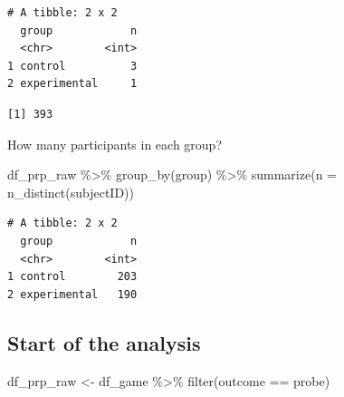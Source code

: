 \documentclass[
  letterpaper,
  DIV=11,
  numbers=noendperiod]{scrartcl}
\newenvironment{Shaded}{\begin{snugshade}}{\end{snugshade}}
\newcommand{\AttributeTok}[1]{\textcolor[rgb]{0.40,0.45,0.13}{#1}}
\newcommand{\CommentTok}[1]{\textcolor[rgb]{0.37,0.37,0.37}{#1}}
\newcommand{\FunctionTok}[1]{\textcolor[rgb]{0.28,0.35,0.67}{#1}}
\newcommand{\NormalTok}[1]{\textcolor[rgb]{0.00,0.23,0.31}{#1}}
\newcommand{\OtherTok}[1]{\textcolor[rgb]{0.00,0.23,0.31}{#1}}
\newcommand{\SpecialCharTok}[1]{\textcolor[rgb]{0.37,0.37,0.37}{#1}}
\newcommand{\StringTok}[1]{\textcolor[rgb]{0.13,0.47,0.30}{#1}}
\begin{document}
\begin{verbatim}
# A tibble: 2 x 2
  group            n
  <chr>        <int>
1 control          3
2 experimental     1
\end{verbatim}

\begin{Shaded}
\end{Shaded}

\begin{verbatim}
[1] 393
\end{verbatim}

How many participants in each group?

\begin{Shaded}
\begin{Highlighting}[]
\NormalTok{df\_prp\_raw }\SpecialCharTok{\%\textgreater{}\%}
  \FunctionTok{group\_by}\NormalTok{(group) }\SpecialCharTok{\%\textgreater{}\%}
  \FunctionTok{summarize}\NormalTok{(}\AttributeTok{n =} \FunctionTok{n\_distinct}\NormalTok{(subjectID))}
\end{Highlighting}
\end{Shaded}

\begin{verbatim}
# A tibble: 2 x 2
  group            n
  <chr>        <int>
1 control        203
2 experimental   190
\end{verbatim}

\subsection{Start of the analysis}\label{start-of-the-analysis}

\begin{Shaded}
\begin{Highlighting}[]
\NormalTok{df\_prp\_raw }\OtherTok{\textless{}{-}}\NormalTok{ df\_game }\SpecialCharTok{\%\textgreater{}\%} \FunctionTok{filter}\NormalTok{(outcome }\SpecialCharTok{==} \StringTok{\textquotesingle{}probe\textquotesingle{}}\NormalTok{)}
\end{Highlighting}
\end{Shaded}
\end{document}
